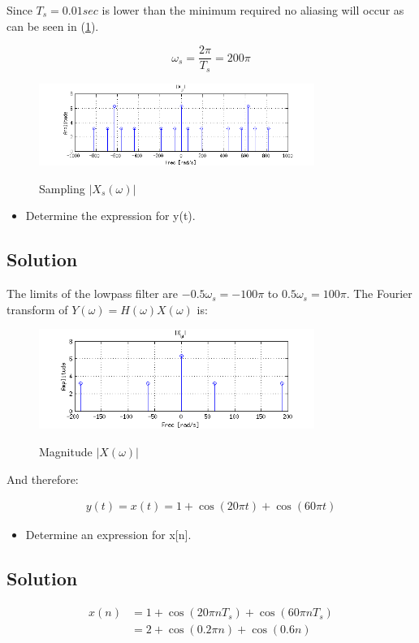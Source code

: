 Since $T_s = 0.01 sec$ is lower than the minimum required no
aliasing will occur as can be seen in (\ref{fig:c3p5a2}).

\begin{equation*}
\omega_s = \frac{2 \pi}{T_s} =  200 \pi
\end{equation*} 


\begin{figure}[H]
\caption{Sampling $|X_s(\omega)|$}
\centering
\includegraphics[width=0.8\textwidth]{figs/c3p5a2.png}
\label{fig:c3p5a2}
\end{figure}

\begin{itemize}
\item Determine the expression for y(t).
\end{itemize} 

\subsection*{Solution}

The limits of the lowpass filter are $-0.5 \omega_s = -100 \pi$ to $0.5 \omega_s = 100 \pi$.
The Fourier transform of $Y(\omega) = H(\omega)X(\omega)$ is:

\begin{figure}[H]
\caption{Magnitude $|X(\omega)|$}
\centering
\includegraphics[width=0.8\textwidth]{figs/c3p5a1.png}
\label{fig:c3p5a1}
\end{figure}

And therefore:

\begin{equation*}
\begin{aligned}
y(t) = x(t) = 1 + \cos(20 \pi t) + \cos(60 \pi t)
\end{aligned}
\end{equation*} 

\begin{itemize}
\item Determine an expression for x[n].
\end{itemize} 

\subsection*{Solution}

\begin{equation*}
\begin{aligned}
x(n) &= 1 + \cos(20 \pi n T_s) + \cos(60 \pi n T_s)\\
     &= 2 + \cos(0.2 \pi n) + \cos(0.6 n)
\end{aligned}
\end{equation*} 

